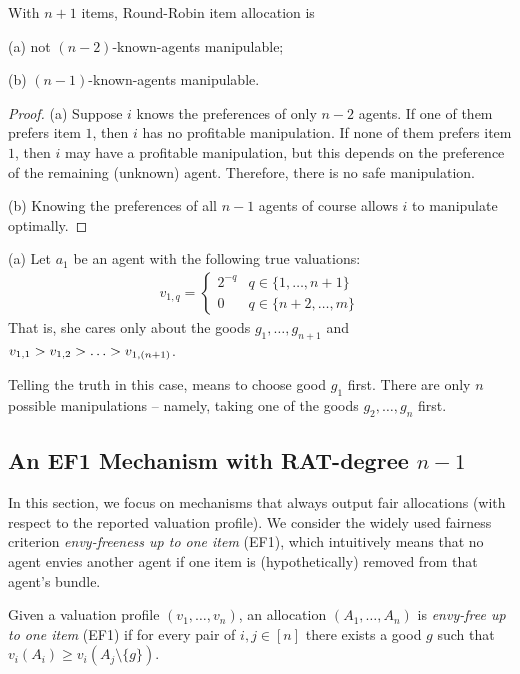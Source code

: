 \begin{proposition}
With $n+1$ items,
Round-Robin item allocation is 

(a) not $(n-2)$-known-agents manipulable;

(b) $(n-1)$-known-agents manipulable.
\end{proposition}
\begin{proof}
(a) Suppose $i$ knows the preferences of only $n-2$ agents.
If one of them prefers item $1$, then $i$ has no profitable manipulation.
If none of them prefers item $1$, then $i$ may have a profitable manipulation, but this depends on the preference of the remaining (unknown) agent. Therefore, there is no safe manipulation.

(b) Knowing the preferences of all $n-1$ agents of course allows $i$ to manipulate optimally.
\end{proof}

(a) Let $a_1$ be an agent with the following true valuations:
    \begin{align*}
        v_{1,q} = 
        \begin{cases}
        2^{-q}  & q\in \{1,\ldots,n+1\}
        \\
        0 & q \in \{n+2,\ldots,m\}
        \end{cases}
    \end{align*}
    That is, she cares only about the goods $g_1,\ldots, g_{n+1}$ and $v_{1,1} > v_{1,2} > \ldots > v_{1,(n+1)}$.

    Telling the truth in this case, means to choose good $g_1$ first. 
    There are only $n$ possible manipulations -- namely, taking one of the goods $g_2,\ldots,g_n$ first.

\fi



   
\subsection{An EF1 Mechanism with RAT-degree $n-1$}
\label{sect:indivisible-EF1-n-1}

In this section, we focus on mechanisms that always output fair allocations (with respect to the reported valuation profile).
We consider the widely used fairness criterion \emph{envy-freeness up to one item} (EF1), which intuitively means that no agent envies another agent if one item is (hypothetically) removed from that agent's bundle.

\begin{definition}
Given a valuation profile $(v_1,\ldots,v_n)$, an allocation $(A_1,\ldots,A_n)$ is \emph{envy-free up to one item} (EF1) if for every pair of $i,j\in [n]$ there exists a good $g$ such that
$v_i(A_i)\geq v_i(A_j\setminus\{g\})$.
\end{definition}


